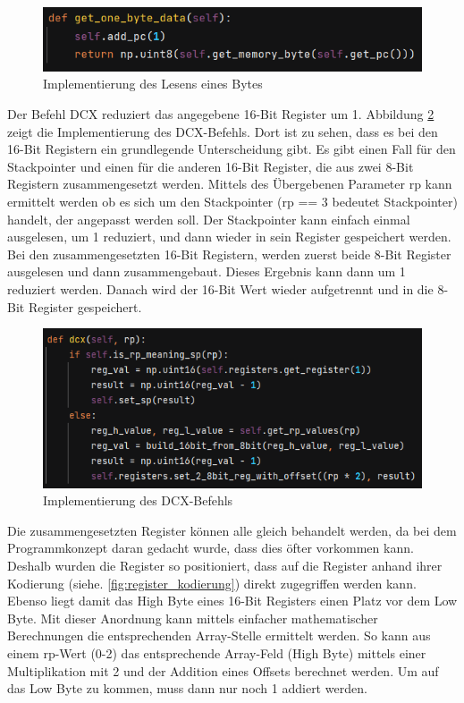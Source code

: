 \documentclass[12pt]{article}
\newcommand{\imgSpaceBefore}{\vspace{10pt}}
\begin{document}
\imgSpaceBefore
\begin{figure}[h]
\centering
\includegraphics[width=15cm]{Bilder/GetOneByteData}
\caption{Implementierung des Lesens eines Bytes}
\label{fig:GetOneByteData}
\end{figure}

\noindent
Der Befehl DCX reduziert das angegebene 16-Bit Register um 1. 
Abbildung \ref{fig:dcx_impl} zeigt die Implementierung des DCX-Befehls.
Dort ist zu sehen, dass es bei den 16-Bit Registern ein grundlegende Unterscheidung gibt. Es gibt einen Fall für den Stackpointer und einen für die anderen 16-Bit Register, die aus zwei 8-Bit Registern zusammengesetzt werden. Mittels des Übergebenen Parameter rp kann ermittelt werden ob es sich um den Stackpointer (rp  == 3 bedeutet Stackpointer) handelt, der angepasst werden soll. 
Der Stackpointer kann einfach einmal ausgelesen, um 1 reduziert, und dann wieder in sein Register gespeichert werden.
Bei den zusammengesetzten 16-Bit Registern, werden zuerst beide 8-Bit Register ausgelesen und dann zusammengebaut. Dieses Ergebnis kann dann um 1 reduziert werden. Danach wird der 16-Bit Wert wieder aufgetrennt und in die 8-Bit Register gespeichert. 

\imgSpaceBefore
\begin{figure}[H]
\centering
\includegraphics[width=15cm]{Bilder/dcx_impl}
\caption{Implementierung des DCX-Befehls}
\label{fig:dcx_impl}
\end{figure}

\noindent
Die zusammengesetzten Register können alle gleich behandelt werden, da bei dem Programmkonzept daran gedacht wurde, dass dies öfter vorkommen kann. Deshalb wurden die Register so positioniert, dass auf die Register anhand ihrer Kodierung (siehe. \ref{fig:register_kodierung}) direkt zugegriffen werden kann. Ebenso liegt damit das High Byte eines 16-Bit Registers einen Platz vor dem Low Byte. Mit dieser Anordnung kann mittels einfacher mathematischer Berechnungen die entsprechenden Array-Stelle ermittelt werden. So kann aus einem rp-Wert (0-2) das entsprechende Array-Feld (High Byte) mittels einer Multiplikation mit 2 und der Addition eines Offsets berechnet werden. Um auf das Low Byte zu kommen, muss dann nur noch 1 addiert werden.
\end{document}
